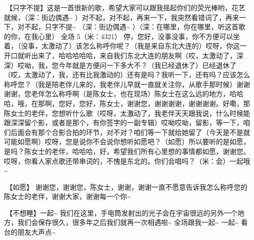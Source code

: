 \documentclass[
]{book}
\begin{document}
🎵【只字不提】这是一首很新的歌，希望大家可以跟我摇起你们的荧光棒哟，花艺就候，（深：街边偶遇\textasciitilde{} ）对不起，对不起，再来一下，我突然看错词了，再来一下，对不起，只字不提\textasciitilde{} （深：街边偶遇\textasciitilde{} ）（深：在哪里，你在哪里，听这首歌的你，在我心里）
全场 5（米：4321） 停，您好，没事没事，你不方便可以坐着，（没事，太激动了）该怎么称呼你呢？（我是来自东北大连的）哎呀，你这一开口就听出来了，哈哈哈哈哈，来自我们东北大连的朋友啊（哎，太激动了，深深）哎呦，我，您今年就是方便问一下多大不？（我已经退休了）已经退休了（哎，太激动了，我，还有比我激动的）还有是吗？我听一下，还有吗？应该怎么称呼您？（我是陪老伴儿来的，我老伴儿早就一直就关注你，从歌手那时候）谢谢谢谢，您老伴怎么称呼啊（是陈女士，也在现场）陈女士在这么远的地方，哈哈哈，哦，在那啊，您好，您好，陈女士，谢谢您，谢谢谢谢，谢谢谢谢。好嘞，那陈女士的老伴，您想听什么歌（哎呀，太激动了，我老伴天天跟我说，什么时候能跟深深留个影，或者是那个，有你签字的一副专辑）哎呦哎呦，留影，等一下，咱们后面会有那个合影合拍的环节，对不对？咱们等一下就给她留了（今天是不是就可能如愿啊）哎呀，您是说你不会说你想听如愿吧？（如愿）所以要听的是如愿，是吗？陈女士的老伴，哈哈哈，好，希望我们所有心里想的事情都如愿，谢谢您。哎呀，你看人家点歌还带串词的，不愧是东北的。你们会唱吗？（米：会）一起哦\textasciitilde{}

🎵【如愿】
谢谢您，谢谢您，陈女士，谢谢，谢谢一直不愿意告诉我怎么称呼您的陈女士的老伴，谢谢大家，谢谢每一个你\textasciitilde{}

🎵【不想睡】一起\textasciitilde{} 我们在这里，手电筒发射出的光子会在宇宙很远的另外一个地方，我们会保存很久，很多年之后我们就再一次相遇啦\textasciitilde{} 全场跟我一起\textasciitilde{} 一起\textasciitilde{} 看台的朋友大声点\textasciitilde{}
\end{document}
